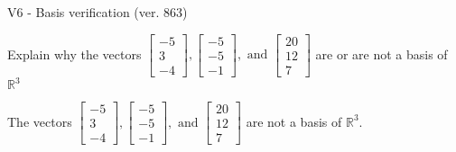 \begin{exercise}
  \begin{exerciseTitle}V6 - Basis verification (ver. 863)\end{exerciseTitle}
  \begin{exerciseStatement}
    Explain why the vectors \(\left[\begin{array}{r}
-5 \\
3 \\
-4
\end{array}\right] , \left[\begin{array}{r}
-5 \\
-5 \\
-1
\end{array}\right] , \text{ and } \left[\begin{array}{r}
20 \\
12 \\
7
\end{array}\right]\) are or are not a basis of \(\mathbb{R}^3\)	


  \end{exerciseStatement}
  \begin{exerciseAnswer}
   The vectors \(\left[\begin{array}{r}
-5 \\
3 \\
-4
\end{array}\right] , \left[\begin{array}{r}
-5 \\
-5 \\
-1
\end{array}\right] , \text{ and } \left[\begin{array}{r}
20 \\
12 \\
7
\end{array}\right]\) 
  	 are not  a basis of \(\mathbb{R}^3\).
  


  \end{exerciseAnswer}
\end{exercise}